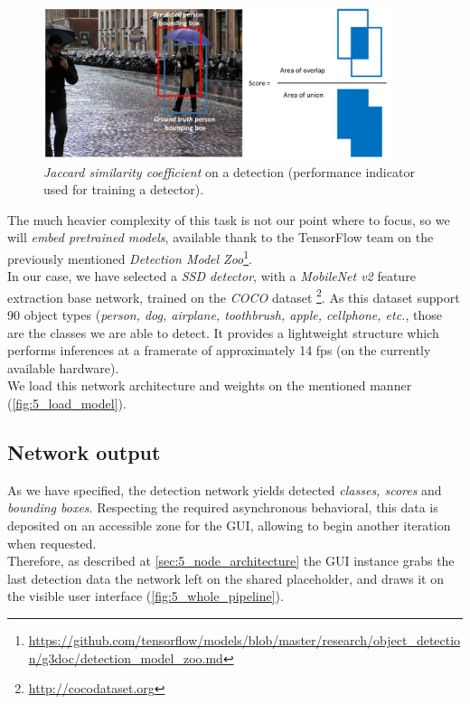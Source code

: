 		\begin{figure}[h!]
			\centering
			\includegraphics[width=4in]{images/detection_iou}
			\caption{\emph{Jaccard similarity coefficient} on a detection (performance indicator used for training a detector).}
			\label{fig:5_iou}
		\end{figure}
	
		The much heavier complexity of this task is not our point where to focus, so we will \emph{embed pretrained models}, available thank to the TensorFlow team on the previously mentioned \emph{Detection Model Zoo}\footnote{\url{https://github.com/tensorflow/models/blob/master/research/object_detection/g3doc/detection_model_zoo.md}}.\\
		
		In our case, we have selected a \emph{SSD detector}, with a \emph{MobileNet v2} feature extraction base network, trained on the \emph{COCO} dataset \footnote{\url{http://cocodataset.org}}. As this dataset support 90 object types (\emph{person, dog, airplane, toothbrush, apple, cellphone, etc.}, those are the classes we are able to detect. It provides a lightweight structure which performs inferences at a framerate of approximately 14 fps (on the currently available hardware).\\
		
		We load this network architecture and weights on the mentioned manner (\autoref{fig:5_load_model}). 
	
	
	\subsection{Network output}
		As we have specified, the detection network yields detected \emph{classes, scores} and \emph{bounding boxes}. Respecting the required asynchronous behavioral, this data is deposited on an accessible zone for the GUI, allowing to begin another iteration when requested.\\
		
		Therefore, as described at \autoref{sec:5_node_architecture} the GUI instance grabs the last detection data the network left on the shared placeholder, and draws it on the visible user interface (\autoref{fig:5_whole_pipeline}).
		
